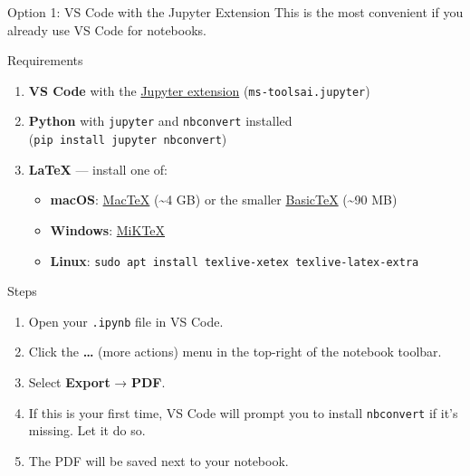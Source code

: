 \documentclass[
  ignorenonframetext,
  aspectratio=169,
]{beamer}
\providecommand{\tightlist}{%
  \setlength{\itemsep}{0pt}\setlength{\parskip}{0pt}}
\begin{document}
\begin{frame}[fragile]{Option 1: VS Code with the Jupyter Extension}
\protect{}\label{option-1-vs-code-with-the-jupyter-extension}
This is the most convenient if you already use VS Code for notebooks.

\begin{block}{Requirements}
\protect{}\label{requirements}
\begin{enumerate}
\tightlist
\item
  \textbf{VS Code} with the
  \href{https://marketplace.visualstudio.com/items?itemName=ms-toolsai.jupyter}{Jupyter
  extension} (\texttt{ms-toolsai.jupyter})
\item
  \textbf{Python} with \texttt{jupyter} and \texttt{nbconvert} installed
  (\texttt{pip\ install\ jupyter\ nbconvert})
\item
  \textbf{LaTeX} --- install one of:

  \begin{itemize}
  \tightlist
  \item
    \textbf{macOS}: \href{https://tug.org/mactex/}{MacTeX}
    (\textasciitilde4 GB) or the smaller
    \href{https://tug.org/mactex/morepackages.html}{BasicTeX}
    (\textasciitilde90 MB)
  \item
    \textbf{Windows}: \href{https://miktex.org/}{MiKTeX}
  \item
    \textbf{Linux}:
    \texttt{sudo\ apt\ install\ texlive-xetex\ texlive-latex-extra}
  \end{itemize}
\end{enumerate}
\end{block}

\begin{block}{Steps}
\protect{}\label{steps}
\begin{enumerate}
\tightlist
\item
  Open your \texttt{.ipynb} file in VS Code.
\item
  Click the \textbf{\ldots{}} (more actions) menu in the top-right of
  the notebook toolbar.
\item
  Select \textbf{Export} → \textbf{PDF}.
\item
  If this is your first time, VS Code will prompt you to install
  \texttt{nbconvert} if it's missing. Let it do so.
\item
  The PDF will be saved next to your notebook.
\end{enumerate}
\end{block}


\end{frame}
\end{document}
